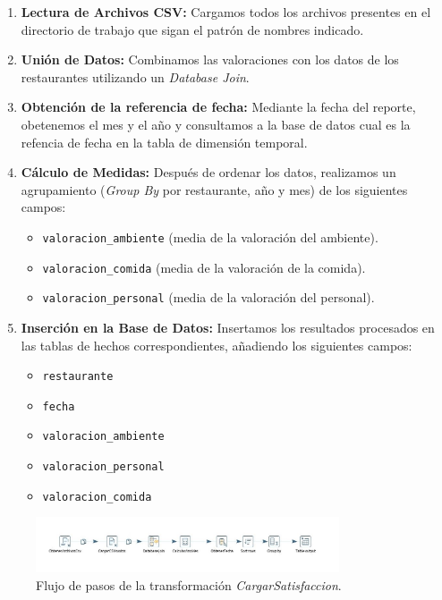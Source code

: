 \documentclass[11pt]{opticajnl}
\begin{document}
\begin{enumerate}
    \item \textbf{Lectura de Archivos CSV:} Cargamos todos los archivos presentes en el directorio de trabajo que sigan el patrón de nombres indicado.
    \item \textbf{Unión de Datos:} Combinamos las valoraciones con los datos de los restaurantes utilizando un \textit{Database Join}.
    \item \textbf{Obtención de la referencia de fecha:} Mediante la fecha del reporte, obetenemos el mes y el año y consultamos a la base de datos cual es la refencia de fecha en la tabla de dimensión temporal.
    \item \textbf{Cálculo de Medidas:} Después de ordenar los datos, realizamos un agrupamiento (\textit{Group By} por restaurante, año y mes) de los siguientes campos:
    \begin{itemize}
        \item \texttt{valoracion\_ambiente} (media de la valoración del ambiente).
        \item \texttt{valoracion\_comida} (media de la valoración de la comida).
        \item \texttt{valoracion\_personal} (media de la valoración del personal).
    \end{itemize}
    \item \textbf{Inserción en la Base de Datos:} Insertamos los resultados procesados en las tablas de hechos correspondientes, añadiendo los siguientes campos:
    \begin{itemize}
        \item \texttt{restaurante}
        \item \texttt{fecha}
        \item \texttt{valoracion\_ambiente}
        \item \texttt{valoracion\_personal}
        \item \texttt{valoracion\_comida}
    \end{itemize}
\end{enumerate}

\begin{figure}[h]
    \centering
    \includegraphics[width=0.8\textwidth]{fotos/cargarsatisfaccion.jpg}
    \caption{Flujo de pasos de la transformación \textit{CargarSatisfaccion}.}
    \label{fig:etl_valoraciones}
\end{figure}
\end{document}
